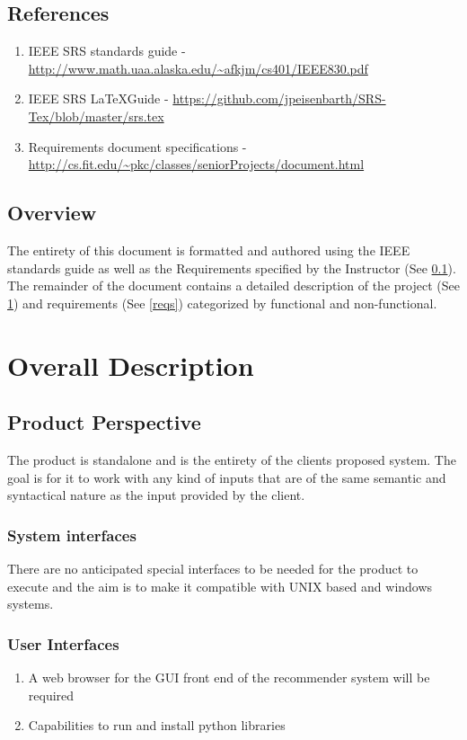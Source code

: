\documentclass[12pt]{article}
\begin{document}
	\subsection{References} \label{refs}
		\begin{enumerate}
		\item IEEE SRS standards guide -  \url{http://www.math.uaa.alaska.edu/~afkjm/cs401/IEEE830.pdf}
		\item IEEE SRS \LaTeX Guide - \url{https://github.com/jpeisenbarth/SRS-Tex/blob/master/srs.tex}
		\item Requirements document specifications - \url{http://cs.fit.edu/~pkc/classes/seniorProjects/document.html}
	\end{enumerate}
	\subsection{Overview} \label{overview}
	The entirety of this document is formatted and authored using the IEEE standards guide as well as the Requirements specified by the Instructor (See \ref{refs}). The remainder of the document contains a detailed description of the project (See \ref{desc}) and requirements (See \ref{reqs}) categorized by functional and non-functional. 
	\section{Overall Description} \label{desc}
	\subsection{Product Perspective}
	The product is standalone and is the entirety of the clients proposed system. The goal is for it to work with any kind of inputs that are of the same semantic and syntactical nature as the input provided by the client. 
	\subsubsection{System interfaces}
	There are no anticipated special interfaces to be needed for the product to execute and the aim is to make it compatible with UNIX based and windows systems.
	\subsubsection{User Interfaces}
	\begin{enumerate}
		\item A web browser for the GUI front end of the recommender system will be required
		\item Capabilities to run and install python libraries
	\end{enumerate}
\end{document}
